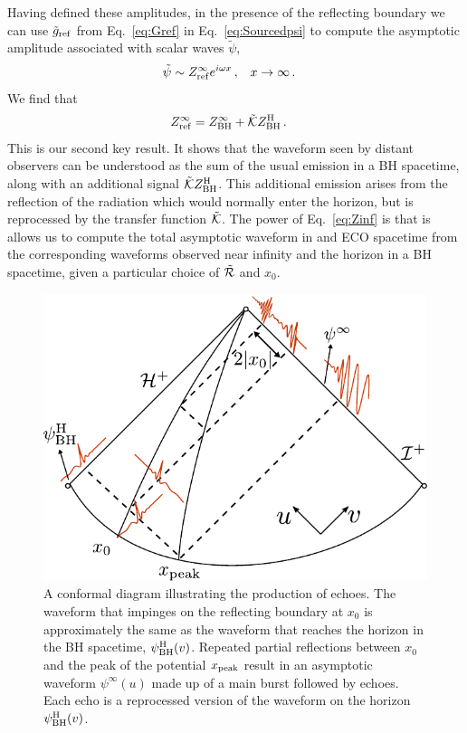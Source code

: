 \begin{refsection}
Having defined these amplitudes, in the presence of the reflecting boundary we can use $\tilde g_{\rm ref}$ from Eq.~\eqref{eq:Gref} in Eq.~\eqref{eq:Sourcedpsi} to compute the asymptotic amplitude associated with scalar waves $\tilde \psi$,
\begin{align}
\tilde \psi & \sim Z^{\infty}_{\rm ref} e^{i \omega x} \,, & x & \to \infty \,. \label{eq:Zrefdef}
\end{align}
We find that
\begin{align}
\label{eq:Zinf}
Z^{\infty}_{\rm ref} & = Z^{\infty}_{\rm BH} + \tilde{\mathcal K} Z^{\rm H}_{\rm BH} \,.
\end{align}
This is our second key result.
It shows that the waveform seen by distant observers can be understood as the sum of the usual emission in a BH spacetime, along with an additional signal $\tilde{\mathcal K} Z^{\rm H}_{\rm BH}$.
This additional emission arises from the reflection of the radiation which would normally enter the horizon, but is reprocessed by the transfer function $\tilde{\mathcal K}$.
The power of Eq.~\eqref{eq:Zinf} is that is allows us to compute the total asymptotic waveform in and ECO spacetime from the corresponding waveforms observed near infinity and the horizon in a BH spacetime, given a particular choice of $\tilde{\mathcal R}$ and $x_0$.

\begin{figure}[t]
\includegraphics[width = 1.0 \columnwidth]{chapter_echo/etc/CausalDiagram.pdf}
\caption{A conformal diagram illustrating the production of echoes. The waveform that impinges on the reflecting boundary at $x_0$ is approximately the same as the waveform that reaches the horizon in the BH spacetime, $\psi^{\rm H}_{\rm BH}(v)$. Repeated partial reflections between $x_0$ and the peak of the potential $x_{\rm peak}$ result in an asymptotic waveform $\psi^\infty(u)$ made up of a main burst followed by echoes. Each echo is a reprocessed version of the waveform on the horizon $\psi^{\rm H}_{\rm BH}(v)$.}
\label{fig:CausalDiagram}
\end{figure}


\end{refsection}
